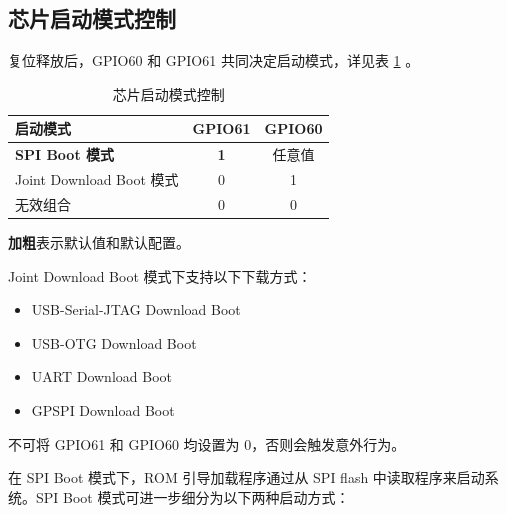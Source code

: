 \documentclass[main\_\_CN.tex]{subfiles}
\begin{document}
\subsection{芯片启动模式控制}
\label{sec:bootModeControl}

复位释放后，GPIO60 和 GPIO61 共同决定启动模式，详见表 \ref{tab:bootctrl-boot-mode-control} \textit{}。

\begin{table}[H]
    \centering
    \caption{芯片启动模式控制}
    \label{tab:bootctrl-boot-mode-control}

    \begin{threeparttable}
    \begin{tabular}{ | l | c | c | }
    \hline
        \rowcolor{lightgray}
     \textbf{启动模式} & \textbf{GPIO61} & \textbf{GPIO60} \\\hline
        
        \textbf{SPI Boot 模式} \tnote{1} & \textbf{1} & 任意值 \\\hline
        Joint Download Boot 模式 \tnote{2} & 0 & 1 \\\hline
        无效组合\tnote{3} & 0 & 0 \\\hline 
        \end{tabular}

        \begin{tablenotes}
            \item[1] \textbf{加粗}表示默认值和默认配置。
            \item[2] Joint Download Boot 模式下支持以下下载方式：
                \begin{itemize}
                    \item USB-Serial-JTAG Download Boot
                    \item USB-OTG Download Boot
                    \item UART Download Boot
                    \item GPSPI Download Boot
                \end{itemize}
          \item[3] 不可将 GPIO61 和 GPIO60 均设置为 0，否则会触发意外行为。
        \end{tablenotes}
     \end{threeparttable}
\end{table}

在 SPI Boot 模式下，ROM 引导加载程序通过从 SPI flash 中读取程序来启动系统。SPI Boot 模式可进一步细分为以下两种启动方式：
\end{document}
